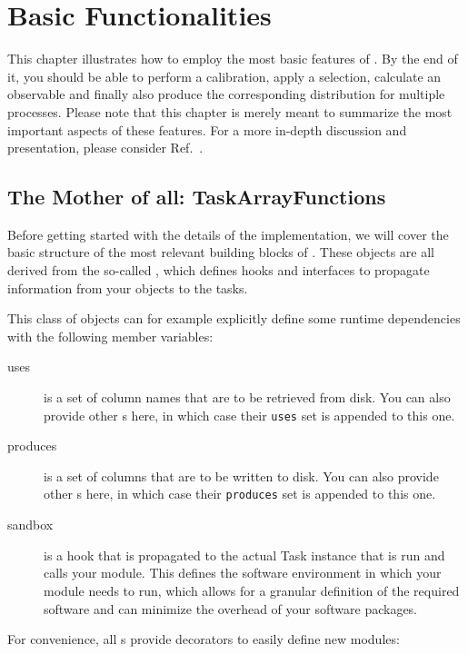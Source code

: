 \chapter{Basic Functionalities}\label{chap:basics}
This chapter illustrates how to employ the most basic features of \columnflow.
By the end of it, you should be able to perform a calibration, apply a selection, calculate an observable and finally also produce the corresponding distribution for multiple processes.
Please note that this chapter is merely meant to summarize the most important aspects of these features.
For a more in-depth discussion and presentation, please consider Ref.~\cite{cf_repo}.

\section{The Mother of all: TaskArrayFunctions}\label{sec:taskarrayfunc}

Before getting started with the details of the implementation, we will cover the basic structure of the most relevant building blocks of \columnflow.
These objects are all derived from the so-called , which defines hooks and interfaces to propagate information from your objects to the \columnflow tasks.

This class of objects can for example explicitly define some runtime dependencies with the following member variables:
\begin{description}
	\item[uses] is a set of column names that are to be retrieved from disk.
	You can also provide other s here, in which case their \texttt{uses} set is appended to this one.
	\item[produces] is a set of columns that are to be written to disk.
	You can also provide other s here, in which case their \texttt{produces} set is appended to this one.
	\item[sandbox] is a hook that is propagated to the actual Task instance that is run and calls your module.
	This defines the software environment in which your module needs to run, which allows for a granular definition of the required software and can minimize the overhead of your software packages.
	
\end{description}

For convenience, all  s provide decorators to easily define new modules:

